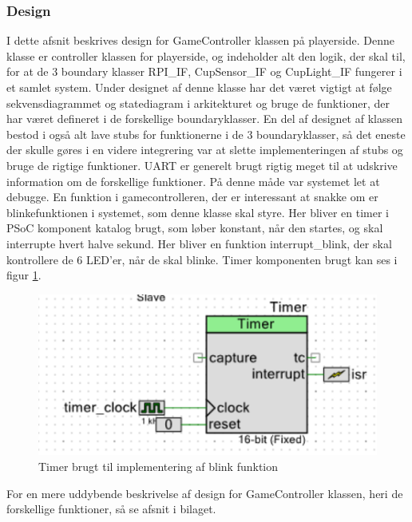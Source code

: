 \documentclass[Rapport/Playerside/GameController/GameController.tex]{subfiles}
\begin{document}
\subsubsection{Design}
I dette afsnit beskrives design for GameController klassen på playerside. Denne klasse er controller klassen for playerside, og indeholder alt den logik, der skal til, for at de 3 boundary klasser RPI\_IF, CupSensor\_IF og CupLight\_IF fungerer i et samlet system. Under designet af denne klasse har det været vigtigt at følge sekvensdiagrammet og statediagram i arkitekturet og bruge de funktioner, der har været defineret i de forskellige boundaryklasser. En del af designet af klassen bestod i også alt lave stubs for funktionerne i de 3 boundaryklasser, så det eneste der skulle gøres i en videre integrering var at slette implementeringen af stubs og bruge de rigtige funktioner. UART er generelt brugt rigtig meget til at udskrive information om de forskellige funktioner. På denne måde var systemet let at debugge. En funktion i gamecontrolleren, der er interessant at snakke om er blinkefunktionen i systemet, som denne klasse skal styre. Her bliver en timer i PSoC komponent katalog brugt, som løber konstant, når den startes, og skal interrupte hvert halve sekund. Her bliver en funktion interrupt\_blink, der skal kontrollere de 6 LED'er, når de  skal blinke. Timer komponenten brugt kan ses i figur \ref{fig:Timer}.
\begin{figure}
    \centering 
    \includegraphics[width=0.5\linewidth]{Softwaredesign/GameController/graphic/gamecontroller_timer.PNG}
    \caption{Timer brugt til implementering af blink funktion}
    \label{fig:Timer}
\end{figure}
For en mere uddybende beskrivelse af design for GameController klassen, heri de forskellige funktioner, så se afsnit  i bilaget.
\end{document}
